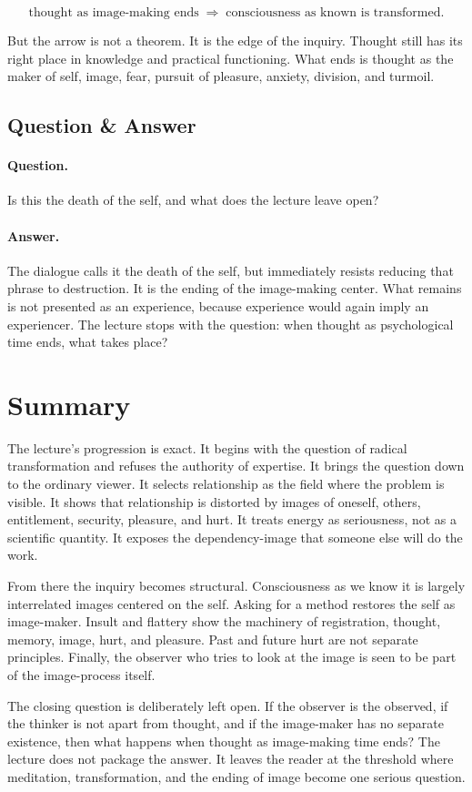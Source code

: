 \begin{equation}
\text{thought as image-making ends}
\;\Longrightarrow\;
\text{consciousness as known is transformed}.
\end{equation}

But the arrow is not a theorem. It is the edge of the inquiry. Thought still has its right place in knowledge and practical functioning. What ends is thought as the maker of self, image, fear, pursuit of pleasure, anxiety, division, and turmoil.

\subsection{Question \& Answer}

\paragraph{Question.}
Is this the death of the self, and what does the lecture leave open?

\paragraph{Answer.}
The dialogue calls it the death of the self, but immediately resists reducing that phrase to destruction. It is the ending of the image-making center. What remains is not presented as an experience, because experience would again imply an experiencer. The lecture stops with the question: when thought as psychological time ends, what takes place?

\section{Summary}

The lecture's progression is exact. It begins with the question of radical transformation and refuses the authority of expertise. It brings the question down to the ordinary viewer. It selects relationship as the field where the problem is visible. It shows that relationship is distorted by images of oneself, others, entitlement, security, pleasure, and hurt. It treats energy as seriousness, not as a scientific quantity. It exposes the dependency-image that someone else will do the work.

From there the inquiry becomes structural. Consciousness as we know it is largely interrelated images centered on the self. Asking for a method restores the self as image-maker. Insult and flattery show the machinery of registration, thought, memory, image, hurt, and pleasure. Past and future hurt are not separate principles. Finally, the observer who tries to look at the image is seen to be part of the image-process itself.

The closing question is deliberately left open. If the observer is the observed, if the thinker is not apart from thought, and if the image-maker has no separate existence, then what happens when thought as image-making time ends? The lecture does not package the answer. It leaves the reader at the threshold where meditation, transformation, and the ending of image become one serious question.